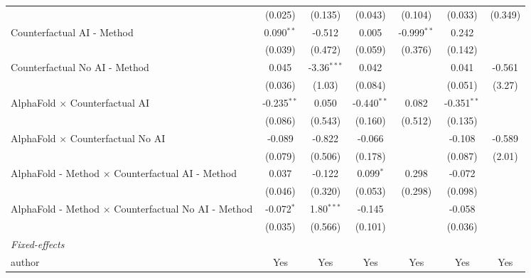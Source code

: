 \begin{tabular}{lcccccc}
                                                              & (0.025)       & (0.135)       & (0.043)       & (0.104)       & (0.033)       & (0.349)\\   
   Counterfactual AI - Method                                 & 0.090$^{**}$  & -0.512        & 0.005         & -0.999$^{**}$ & 0.242         &   \\   
                                                              & (0.039)       & (0.472)       & (0.059)       & (0.376)       & (0.142)       &   \\   
   Counterfactual No AI - Method                              & 0.045         & -3.36$^{***}$ & 0.042         &               & 0.041         & -0.561\\   
                                                              & (0.036)       & (1.03)        & (0.084)       &               & (0.051)       & (3.27)\\   
   AlphaFold $\times$ Counterfactual AI                       & -0.235$^{**}$ & 0.050         & -0.440$^{**}$ & 0.082         & -0.351$^{**}$ &   \\   
                                                              & (0.086)       & (0.543)       & (0.160)       & (0.512)       & (0.135)       &   \\   
   AlphaFold $\times$ Counterfactual No AI                    & -0.089        & -0.822        & -0.066        &               & -0.108        & -0.589\\   
                                                              & (0.079)       & (0.506)       & (0.178)       &               & (0.087)       & (2.01)\\   
   AlphaFold - Method $\times$ Counterfactual AI - Method     & 0.037         & -0.122        & 0.099$^{*}$   & 0.298         & -0.072        &   \\   
                                                              & (0.046)       & (0.320)       & (0.053)       & (0.298)       & (0.098)       &   \\   
   AlphaFold - Method $\times$ Counterfactual No AI - Method  & -0.072$^{*}$  & 1.80$^{***}$  & -0.145        &               & -0.058        &   \\   
                                                              & (0.035)       & (0.566)       & (0.101)       &               & (0.036)       &   \\   
   \midrule
   \emph{Fixed-effects}\\
   author                                                     & Yes           & Yes           & Yes           & Yes           & Yes           & Yes\\  

\end{tabular}
